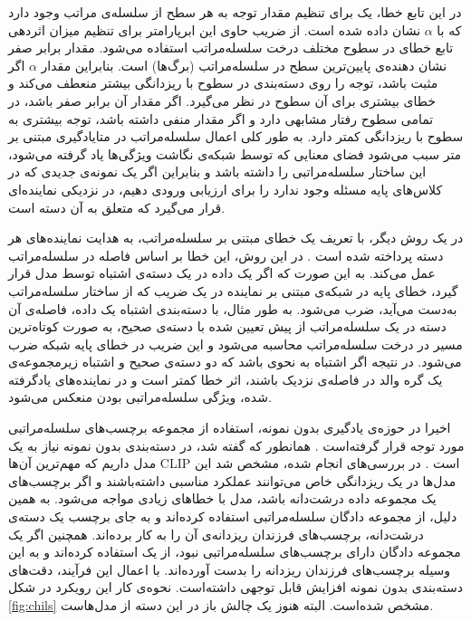 در این تابع خطا، یک 
برای تنظیم مقدار توجه به هر سطح از سلسله‌ی مراتب وجود دارد که با
$\alpha$
نشان داده شده است. از ضریب حاوی این ابرپارامتر برای تنظیم میزان اثردهی تابع خطای 
در سطوح مختلف درخت سلسله‌مراتب استفاده می‌شود. مقدار 
برابر صفر نشان دهنده‌ی پایین‌ترین سطح در سلسله‌مراتب (برگ‌ها) است. بنابراین مقدار 
$\alpha$
اگر مثبت باشد، توجه را روی دسته‌بندی در سطوح با ریزدانگی بیشتر منعطف می‌کند و خطای بیشتری برای آن سطوح در نظر می‌گیرد. اگر مقدار آن برابر صفر باشد، در تمامی سطوح رفتار مشابهی دارد و اگر مقدار منفی داشته باشد، توجه بیشتری به سطوح با ریزدانگی کمتر دارد. به طور کلی اعمال سلسله‌مراتب در متایادگیری مبتنی بر متر سبب می‌شود فضای معنایی که توسط شبکه‌ی نگاشت ویژگی‌ها یاد گرفته می‌شود، این ساختار سلسله‌مراتبی را داشته باشد و بنابراین اگر یک نمونه‌ی جدیدی که در کلاس‌های پایه مسئله وجود ندارد را برای ارزیابی ورودی دهیم، در نزدیکی نماینده‌ای قرار می‌گیرد که متعلق به آن دسته است.

در یک روش دیگر، با تعریف یک خطای مبتنی بر سلسله‌مراتب، به هدایت نماینده‌های هر دسته پرداخته شده است
\cite{Garnot2020LeveragingCH}
.
در این روش، این خطا بر اساس فاصله در سلسله‌مراتب عمل می‌کند. به این صورت که اگر یک داده در یک دسته‌ی اشتباه توسط مدل قرار گیرد، خطای پایه در شبکه‌ی مبتنی بر نماینده در یک ضریب که از ساختار سلسله‌مراتب به‌دست می‌آید، ضرب می‌شود. به طور مثال، با دسته‌بندی اشتباه یک داده، فاصله‌ی آن دسته در یک سلسله‌مراتب از پیش تعیین شده با دسته‌ی صحیح، به صورت کوتاه‌ترین مسیر در درخت سلسله‌مراتب محاسبه می‌شود و این ضریب در خطای پایه شبکه ضرب می‌شود. در نتیجه اگر اشتباه به نحوی باشد که دو دسته‌ی صحیح و اشتباه زیرمجموعه‌ی یک گره والد در فاصله‌ی نزدیک باشند، اثر خطا کمتر است و در نماینده‌های یادگرفته شده، ویژگی سلسله‌مراتبی بودن منعکس می‌شود.

اخیرا در حوزه‌ی یادگیری بدون نمونه، استفاده از مجموعه برچسب‌های سلسله‌مراتبی مورد توجه قرار گرفته‌است
\cite{Novack2023CHiLSZI}.
 همانطور که گفته شد، در دسته‌بندی بدون نمونه نیاز به یک مدل 
داریم که مهم‌ترین آن‌ها CLIP است
\cite{clip}
.
در بررسی‌های انجام شده، مشخص شد این مدل‌ها در یک ریزدانگی خاص می‌توانند عملکرد مناسبی داشته‌باشند و اگر برچسب‌های یک مجموعه داده درشت‌دانه باشد، مدل با خطاهای زیادی مواجه می‌شود. به همین دلیل، از مجموعه دادگان سلسله‌مراتبی استفاده کرده‌اند و به جای برچسب یک دسته‌ی درشت‌دانه، برچسب‌های فرزندان ریز‌دانه‌ی آن را به کار برده‌اند. همچنین اگر یک مجموعه‌ دادگان دارای برچسب‌های سلسله‌مراتبی نبود، از یک 
استفاده کرده‌اند و به این وسیله برچسب‌های فرزندان ریزدانه را بدست آورده‌اند. با اعمال این فرآیند، دقت‌های دسته‌بندی بدون نمونه افزایش قابل توجهی داشته‌است. نحوه‌ی کار این رویکرد در شکل 
\ref{fig:chils}
مشخص شده‌است. البته 
هنوز یک چالش باز در این دسته از مدل‌هاست. 

